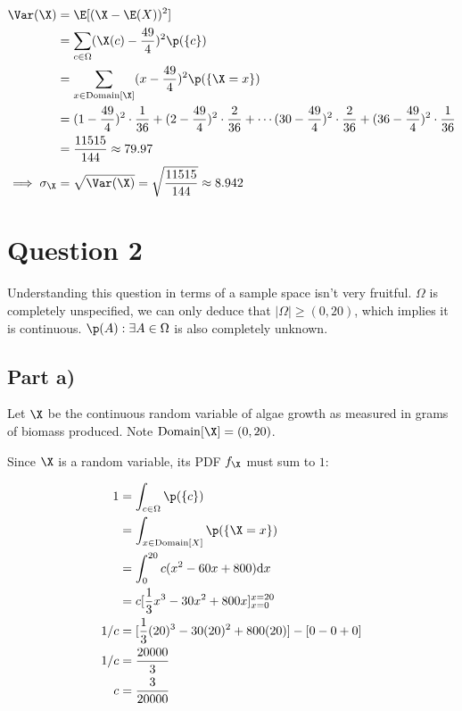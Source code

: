 \begin{align*}
\Var (\X) &= \E [(\X - \E (X))^2] \\
&= \sum _{c \in \Omega} (\X(c) - \frac{49}{4})^2 \p (\{ c \}) \\
&= \sum _{x \in \mathrm{Domain}[\X]} (x - \frac{49}{4})^2 \p (\{ \X = x \}) \\
&= (1 - \frac{49}{4})^2 \cdot \frac{1}{36} + (2 - \frac{49}{4})^2 \cdot \frac{2}{36} + \cdots
	(30 - \frac{49}{4})^2 \cdot \frac{2}{36} + (36 - \frac{49}{4})^2 \cdot \frac{1}{36} \\
&= \frac{11515}{144} \approx 79.97 \\
\implies \sigma _{\X} &= \sqrt{\Var(\X)} = \sqrt{\frac{11515}{144}} \approx 8.942
\end{align*}

\newpage

\section*{Question 2}

Understanding this question in terms of a sample space isn't very fruitful.
$\Omega$ is completely unspecified, we can only deduce that $|\Omega| \geq (0, 20)$, which implies it is continuous.
$\p (A) : \exists A \in \Omega$ is also completely unknown.

\subsection*{Part a)}

Let $\X$ be the continuous random variable of algae growth as measured in grams of biomass produced.
Note $\mathrm{Domain}[\X] = (0, 20)$.

Since $\X$ is a random variable, its PDF $f_{\X}$ must sum to $1$:

\begin{align*}
1 &= \int _{c \in \Omega} \p (\{ c \}) \\
&= \int _{x \in \mathrm{Domain}[X]} \p(\{ \X = x \}) \\
&= \int _0 ^{20} c(x^2 - 60x + 800) \mathrm{d}x \\
&= c[\frac{1}{3}x^3 - 30x^2 + 800x]_{x = 0}^{x=20} \\
1/c &= [\frac{1}{3}(20)^3 - 30(20)^2 + 800(20)] - [0 - 0 + 0] \\
1/c &= \frac{20000}{3} \\
c &= \frac{3}{20000}
\end{align*}

